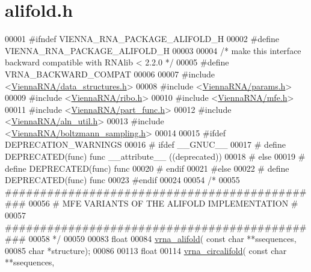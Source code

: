 \hypertarget{alifold_8h_source}{}\section{alifold.\+h}
\label{alifold_8h_source}

\begin{DoxyCode}
00001 \textcolor{preprocessor}{#ifndef VIENNA\_RNA\_PACKAGE\_ALIFOLD\_H}
00002 \textcolor{preprocessor}{#define VIENNA\_RNA\_PACKAGE\_ALIFOLD\_H}
00003 
00004 \textcolor{comment}{/* make this interface backward compatible with RNAlib < 2.2.0 */}
00005 \textcolor{preprocessor}{#define VRNA\_BACKWARD\_COMPAT}
00006 
00007 \textcolor{preprocessor}{#include <\hyperlink{data__structures_8h}{ViennaRNA/data\_structures.h}>}
00008 \textcolor{preprocessor}{#include <\hyperlink{params_8h}{ViennaRNA/params.h}>}
00009 \textcolor{preprocessor}{#include <\hyperlink{ribo_8h}{ViennaRNA/ribo.h}>}
00010 \textcolor{preprocessor}{#include <\hyperlink{mfe_8h}{ViennaRNA/mfe.h}>}
00011 \textcolor{preprocessor}{#include <\hyperlink{part__func_8h}{ViennaRNA/part\_func.h}>}
00012 \textcolor{preprocessor}{#include <\hyperlink{aln__util_8h}{ViennaRNA/aln\_util.h}>}
00013 \textcolor{preprocessor}{#include <\hyperlink{boltzmann__sampling_8h}{ViennaRNA/boltzmann\_sampling.h}>}
00014 
00015 \textcolor{preprocessor}{#ifdef DEPRECATION\_WARNINGS}
00016 \textcolor{preprocessor}{# ifdef \_\_GNUC\_\_}
00017 \textcolor{preprocessor}{#  define DEPRECATED(func) func \_\_attribute\_\_ ((deprecated))}
00018 \textcolor{preprocessor}{# else}
00019 \textcolor{preprocessor}{#  define DEPRECATED(func) func}
00020 \textcolor{preprocessor}{# endif}
00021 \textcolor{preprocessor}{#else}
00022 \textcolor{preprocessor}{# define DEPRECATED(func) func}
00023 \textcolor{preprocessor}{#endif}
00024 
00054 \textcolor{comment}{/*}
00055 \textcolor{comment}{##############################################}
00056 \textcolor{comment}{# MFE VARIANTS OF THE ALIFOLD IMPLEMENTATION #}
00057 \textcolor{comment}{##############################################}
00058 \textcolor{comment}{*/}
00059 
00083 \textcolor{keywordtype}{float}
00084 \hyperlink{group__consensus__mfe__fold_ga02098d0c8790f9a37fbef6ad0cfc705c}{vrna\_alifold}( \textcolor{keyword}{const} \textcolor{keywordtype}{char} **ssequences,
00085               \textcolor{keywordtype}{char} *structure);
00086 
00113 \textcolor{keywordtype}{float}
00114 \hyperlink{group__consensus__mfe__fold_ga01ce2cff93ea44c4f4254760ca2bd16c}{vrna\_circalifold}( \textcolor{keyword}{const} \textcolor{keywordtype}{char} **ssequences,

\end{DoxyCode}
